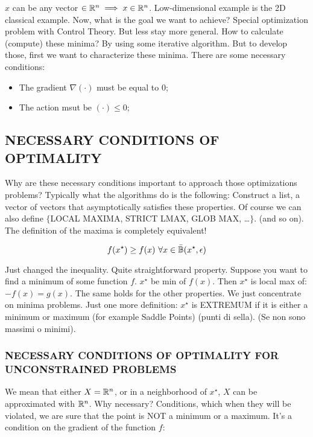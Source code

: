 $x$ can be any vector $\in \mathbb{R}^n \implies x \in \mathbb{R}^n$. Low-dimensional example is the 2D classical example. Now, what is the goal we want to achieve? Special optimization problem with Control Theory. But less stay more general. How to calculate (compute) these minima? By using some iterative algorithm. But to develop those, first we want to characterize these minima. There are some necessary conditions:
\begin{itemize}
\item The gradient $\nabla(\mathord{\cdot})$ must be equal to 0;
\item The action msut be $(\mathord{\cdot}) \leq 0$;
\end{itemize}

\subsection{NECESSARY CONDITIONS OF OPTIMALITY}

Why are these necessary conditions important to approach those optimizations problems? Typically what the algorithms do is the following: Construct a list, a vector of vectors that asymptotically satisfies these properties.
Of course we can also define $\{$LOCAL MAXIMA, STRICT LMAX, GLOB MAX, \dots$\}$. (and so on). The definition of the maxima is completely equivalent!

\[
	f(x^\star) \geq f(x)\ \forall x \in \bar{\mathbb{B}}(x^\star, \epsilon)
\]

Just changed the inequality. Quite straightforward property. Suppose you want to find a minimum of some function $f$. $x^\star$ be min of $f(x)$. Then $x^\star$ is local max of: $-f(x)=g(x)$. The same holds for the other properties. We just concentrate on minima problems. Just one more definition: $x^\star$ is EXTREMUM if it is either a minimum or maximum (for example Saddle Points) (punti di sella). (Se non sono massimi o minimi).

\subsubsection{NECESSARY CONDITIONS OF OPTIMALITY FOR UNCONSTRAINED PROBLEMS}

We mean that either $X=\mathbb{R}^n$, or in a neighborhood of $x^\star$, $X$ can be approximated with $\mathbb{R}^n$. Why necessary? Conditions, which when they will be violated, we are sure that the point is NOT a minimum or a maximum. It's a condition on the gradient of the function $f$:

